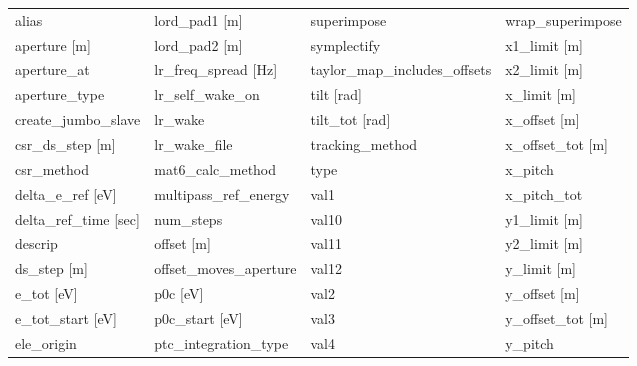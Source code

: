  \begin{tabular}{llll} \toprule
alias                            & lord_pad1 [m]                    & superimpose                      & wrap_superimpose                 \\
aperture [m]                     & lord_pad2 [m]                    & symplectify                      & x1_limit [m]                     \\
aperture_at                      & lr_freq_spread [Hz]              & taylor_map_includes_offsets      & x2_limit [m]                     \\
aperture_type                    & lr_self_wake_on                  & tilt [rad]                       & x_limit [m]                      \\
create_jumbo_slave               & lr_wake                          & tilt_tot [rad]                   & x_offset [m]                     \\
csr_ds_step [m]                  & lr_wake_file                     & tracking_method                  & x_offset_tot [m]                 \\
csr_method                       & mat6_calc_method                 & type                             & x_pitch                          \\
delta_e_ref [eV]                 & multipass_ref_energy             & val1                             & x_pitch_tot                      \\
delta_ref_time [sec]             & num_steps                        & val10                            & y1_limit [m]                     \\
descrip                          & offset [m]                       & val11                            & y2_limit [m]                     \\
ds_step [m]                      & offset_moves_aperture            & val12                            & y_limit [m]                      \\
e_tot [eV]                       & p0c [eV]                         & val2                             & y_offset [m]                     \\
e_tot_start [eV]                 & p0c_start [eV]                   & val3                             & y_offset_tot [m]                 \\
ele_origin                       & ptc_integration_type             & val4                             & y_pitch                          \\

\end{tabular}
